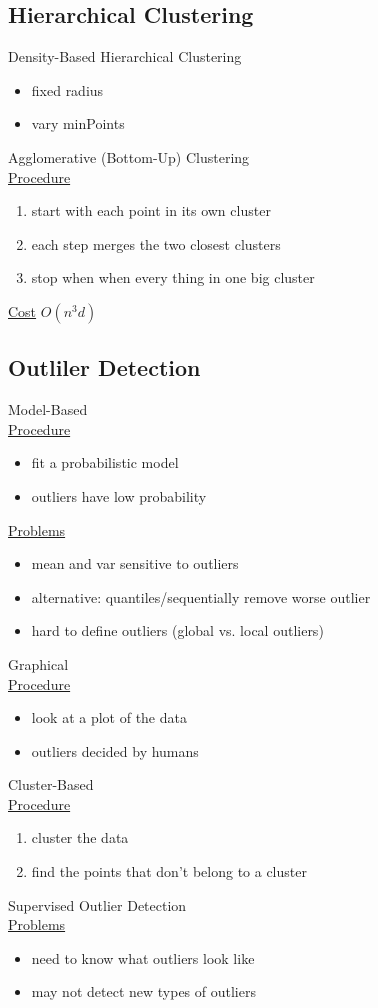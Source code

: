 \documentclass[10pt,landscape,a4paper]{article}
\begin{document}
\begin{multicols*}{5}
\subsection{Hierarchical Clustering}
Density-Based Hierarchical Clustering
\begin{itemize}
    \item fixed radius
    \item vary minPoints
\end{itemize}
Agglomerative (Bottom-Up) Clustering \\
\underline{Procedure}
\begin{enumerate}
    \item start with each point in its own cluster
    \item each step merges the two closest clusters
    \item stop when when every thing in one big cluster
\end{enumerate}
\underline{Cost} \(O(n^3d)\)

\subsection{Outliler Detection}
Model-Based \\
\underline{Procedure}
\begin{itemize}
    \item fit a probabilistic model
    \item outliers have low probability
\end{itemize}
\underline{Problems}
\begin{itemize}
    \item mean and var sensitive to outliers
    \item alternative: quantiles/sequentially remove worse outlier
    \item hard to define outliers (global vs. local outliers)
\end{itemize}
Graphical \\
\underline{Procedure}
\begin{itemize}
    \item look at a plot of the data
    \item outliers decided by humans
\end{itemize}
Cluster-Based \\
\underline{Procedure}
\begin{enumerate}
    \item cluster the data
    \item find the points that don't belong to a cluster
\end{enumerate}
Supervised Outlier Detection \\
\underline{Problems}
\begin{itemize}
    \item need to know what outliers look like
    \item may not detect new types of outliers
\end{itemize}


\end{multicols*}
\end{document}
